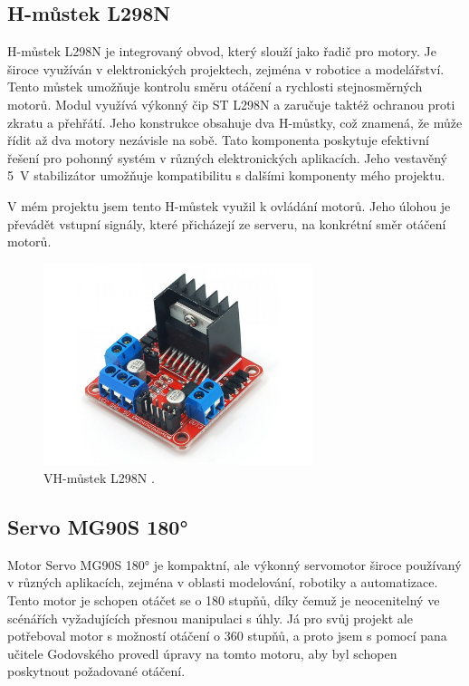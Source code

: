 \documentclass[12pt, a4paper,
oneside
openany
]{report}
\begin{document}
\subsection{H-můstek L298N}
\noindent H-můstek L298N je integrovaný obvod, který slouží jako řadič pro motory. Je široce využíván v elektronických projektech, zejména v robotice a modelářství. Tento můstek umožňuje kontrolu směru otáčení a rychlosti stejnosměrných motorů. Modul využívá výkonný čip ST L298N a zaručuje taktéž ochranou proti zkratu a přehřátí. Jeho konstrukce obsahuje dva H-můstky, což znamená, že může řídit až dva motory nezávisle na sobě. Tato komponenta poskytuje efektivní řešení pro pohonný systém v různých elektronických aplikacích. Jeho vestavěný 5~V stabilizátor umožňuje kompatibilitu s dalšími komponenty mého projektu. 

\noindent V mém projektu jsem tento H-můstek využil k ovládání motorů. Jeho úlohou je převádět vstupní signály, které přicházejí ze serveru, na konkrétní směr otáčení motorů.


\vspace*{0.05\textheight}
	\begin{figure}[ht]
		\centering 
		\includegraphics[width=0.7\textwidth]{image/h-mustek.png} %
		\caption{VH-můstek L298N \cite{h-mustek}.} 
	\end{figure}
 
\newpage
\subsection{Servo MG90S 180°}
\noindent Motor Servo MG90S 180° je kompaktní, ale výkonný servomotor široce používaný v různých aplikacích, zejména v oblasti modelování, robotiky a automatizace. Tento motor je schopen otáčet se o 180 stupňů, díky čemuž je neocenitelný ve scénářích vyžadujících přesnou manipulaci s úhly. Já pro svůj projekt ale potřeboval motor s možností otáčení o 360 stupňů, a proto jsem s pomocí pana učitele Godovského provedl úpravy na tomto motoru, aby byl schopen poskytnout požadované otáčení.
\end{document}

